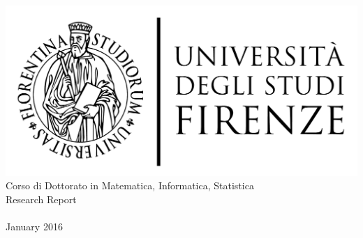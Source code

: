 \documentclass[a4paper,dottedtoc,headinclude,footinclude]{report} %
\newcommand{\myProf}{Donatella Merlini\xspace}
\theoremstyle{plain}
\begin{document}



    
    \begin{titlepage}
        \begin{center}
        \large
          \hfill
          \vfill
          \begingroup
             \includegraphics[scale=0.15]{gfx/logo/unifi}\\
                Corso di Dottorato in Matematica, Informatica, Statistica\\ 
                \vspace{0.5cm}
             \vspace{0.5cm}    
             Research Report
          \endgroup 
          \vfill 
          \begingroup
            \color{Maroon} \\ $\ $\\
        \bigskip
          \endgroup
          \vfill  
          \vfill                   
            January 2016
          \vfill                      
        \end{center}        
    \end{titlepage}   

    \begin{abstract}
        \noindent In this document we show an implementation of a prototype 
        using the \emph{Python} language, on top of \emph{SymPy} module.
        It allows us to \emph{unfold} recurrence relations, where there
        is \emph{one} free variable. We show some applications to recurrences
        describing average numbers of Quicksort's checks and swaps; moreover, 
        possibly new characterizations for Fibonacci numbers are given.
    \end{abstract}
       
\end{document}
